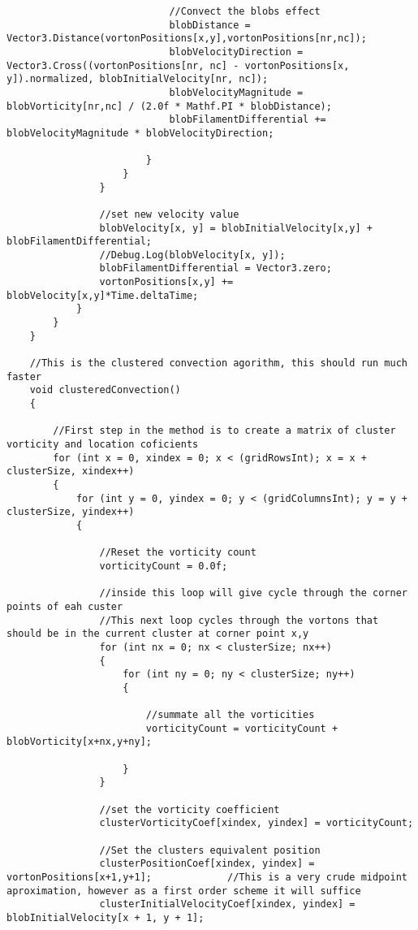 \begin{mdframed}[linecolor=black, topline=true, bottomline=true,
  leftline=false, rightline=false]
\begin{verbatim}
                            //Convect the blobs effect
                            blobDistance = Vector3.Distance(vortonPositions[x,y],vortonPositions[nr,nc]);
                            blobVelocityDirection = Vector3.Cross((vortonPositions[nr, nc] - vortonPositions[x, y]).normalized, blobInitialVelocity[nr, nc]);
                            blobVelocityMagnitude = blobVorticity[nr,nc] / (2.0f * Mathf.PI * blobDistance);
                            blobFilamentDifferential += blobVelocityMagnitude * blobVelocityDirection;

                        }
                    }
                }

                //set new velocity value
                blobVelocity[x, y] = blobInitialVelocity[x,y] + blobFilamentDifferential;
                //Debug.Log(blobVelocity[x, y]);
                blobFilamentDifferential = Vector3.zero;
                vortonPositions[x,y] += blobVelocity[x,y]*Time.deltaTime;
            }
        }
    }

    //This is the clustered convection agorithm, this should run much faster
    void clusteredConvection()
    {

        //First step in the method is to create a matrix of cluster vorticity and location coficients
        for (int x = 0, xindex = 0; x < (gridRowsInt); x = x + clusterSize, xindex++)
        {
            for (int y = 0, yindex = 0; y < (gridColumnsInt); y = y + clusterSize, yindex++)
            {

                //Reset the vorticity count 
                vorticityCount = 0.0f;

                //inside this loop will give cycle through the corner points of eah custer
                //This next loop cycles through the vortons that should be in the current cluster at corner point x,y
                for (int nx = 0; nx < clusterSize; nx++)
                {
                    for (int ny = 0; ny < clusterSize; ny++)
                    {

                        //summate all the vorticities 
                        vorticityCount = vorticityCount + blobVorticity[x+nx,y+ny];

                    }
                }

                //set the vorticity coefficient
                clusterVorticityCoef[xindex, yindex] = vorticityCount;

                //Set the clusters equivalent position
                clusterPositionCoef[xindex, yindex] = vortonPositions[x+1,y+1];             //This is a very crude midpoint aproximation, however as a first order scheme it will suffice    
                clusterInitialVelocityCoef[xindex, yindex] = blobInitialVelocity[x + 1, y + 1];


\end{verbatim}
\end{mdframed}
